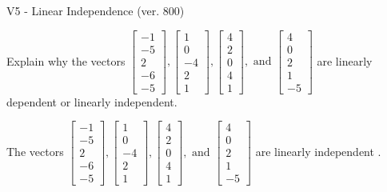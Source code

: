\begin{exercise}
  \begin{exerciseTitle}V5 - Linear Independence (ver. 800)\end{exerciseTitle}
  \begin{exerciseStatement}
    Explain why the vectors \(\left[\begin{array}{r}
-1 \\
-5 \\
2 \\
-6 \\
-5
\end{array}\right] , \left[\begin{array}{r}
1 \\
0 \\
-4 \\
2 \\
1
\end{array}\right] , \left[\begin{array}{r}
4 \\
2 \\
0 \\
4 \\
1
\end{array}\right] , \text{ and } \left[\begin{array}{r}
4 \\
0 \\
2 \\
1 \\
-5
\end{array}\right]\) are linearly dependent or linearly independent.	


  \end{exerciseStatement}
  \begin{exerciseAnswer}
   The vectors \(\left[\begin{array}{r}
-1 \\
-5 \\
2 \\
-6 \\
-5
\end{array}\right] , \left[\begin{array}{r}
1 \\
0 \\
-4 \\
2 \\
1
\end{array}\right] , \left[\begin{array}{r}
4 \\
2 \\
0 \\
4 \\
1
\end{array}\right] , \text{ and } \left[\begin{array}{r}
4 \\
0 \\
2 \\
1 \\
-5
\end{array}\right]\) are 
  	 linearly independent  .
  


  \end{exerciseAnswer}
\end{exercise}